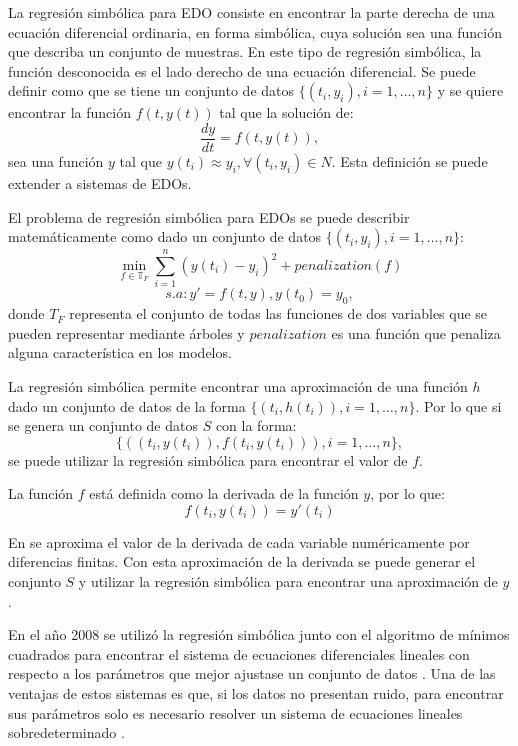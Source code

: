 La regresión simbólica para EDO consiste en encontrar la parte derecha de una ecuación diferencial ordinaria, en forma simbólica, cuya solución sea una función que describa un conjunto de muestras. En este tipo de regresión simbólica, la función desconocida es el lado derecho de una ecuación diferencial. Se puede definir como que se tiene un conjunto de datos $\{(t_i, y_i), i = 1, \dots, n\}$ y se quiere encontrar la función $f(t, y(t))$ tal que la solución de:
\begin{equation*}
    \frac{dy}{dt} = f(t, y(t)),
\end{equation*}
sea una función $y$ tal que $y(t_i) \approx y_i, \forall(t_i, y_i) \in N$. Esta definición se puede extender a sistemas de EDOs.

El problema de regresión simbólica para EDOs se puede describir matemáticamente como dado un conjunto de datos $\{(t_i, y_i), i = 1, \dots, n\}$:
$$\min_{f\in\mathbb{T}_F} \sum_{i=1}^n (y(t_i) - y_i)^2 + penalization(f)$$
$$s.a: y' = f(t, y), y(t_0) = y_0,$$
donde $T_F$ representa el conjunto de todas las funciones de dos variables que se pueden representar mediante árboles y $penalization$ es una función que penaliza alguna característica en los modelos.

La regresión simbólica permite encontrar una aproximación de una función $h$ dado un conjunto de datos de la forma $\{(t_i, h(t_i)), i = 1, \dots, n\}$. Por lo que si se genera un conjunto de datos $S$ con la forma:
$$\{((t_i, y(t_i)), f(t_i, y(t_i))), i = 1, \dots, n\},$$
se puede utilizar la regresión simbólica para encontrar el valor de $f$.

La función $f$ está definida como la derivada de la función $y$, por lo que:
$$f(t_i, y(t_i)) = y'(t_i)$$

En \cite{gaucel2014learning, iba2008inference,kronberger2019identification} se aproxima el valor de la derivada de cada variable numéricamente por diferencias finitas. Con esta aproximación de la derivada se puede generar el conjunto $S$ y utilizar la regresión simbólica para encontrar una aproximación de $y$.

En el año 2008 se utilizó la regresión simbólica junto con el algoritmo de mínimos cuadrados para encontrar el sistema de ecuaciones diferenciales lineales con respecto a los parámetros que mejor ajustase un conjunto de datos \cite{iba2008inference}. Una de las ventajas de estos sistemas es que, si los datos no presentan ruido, para encontrar sus parámetros solo es necesario resolver un sistema de ecuaciones lineales sobredeterminado \cite{myers2012generalized}.


